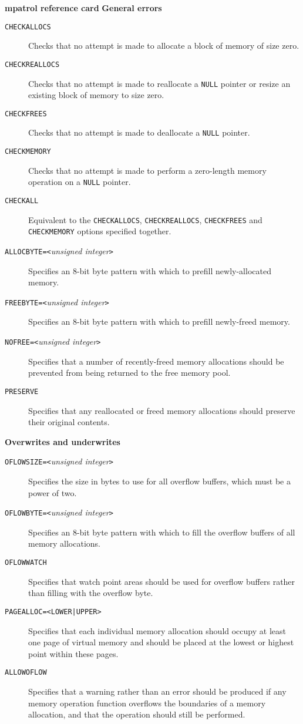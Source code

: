 \documentclass[a4paper,landscape,final]{article}
\newcommand{\heading}[1]{\textbf{\normalsize #1}}
\newcommand{\option}[1]{\texttt{#1}}
\newcommand{\optionarg}[2]{\option{#1}\texttt{=<#2>}}
\newcommand{\optionpar}[2]{\option{#1}\texttt{=<}\textit{#2}\texttt{>}}
\begin{document}
\begin{multicols}{3}{\textbf{\Large mpatrol reference card}}
\vskip 12pt
\heading{General errors}
\vskip 6pt

\begin{description}
\item[\option{CHECKALLOCS}]
Checks that no attempt is made to allocate a block of memory of size zero.
\item[\option{CHECKREALLOCS}]
Checks that no attempt is made to reallocate a \texttt{NULL} pointer or resize
an existing block of memory to size zero.
\item[\option{CHECKFREES}]
Checks that no attempt is made to deallocate a \texttt{NULL} pointer.
\item[\option{CHECKMEMORY}]
Checks that no attempt is made to perform a zero-length memory operation on a
\texttt{NULL} pointer.
\item[\option{CHECKALL}]
Equivalent to the \option{CHECKALLOCS}, \option{CHECKREALLOCS},
\option{CHECKFREES} and \option{CHECKMEMORY} options specified together.
\item[\optionpar{ALLOCBYTE}{unsigned integer}]
Specifies an 8-bit byte pattern with which to prefill newly-allocated memory.
\item[\optionpar{FREEBYTE}{unsigned integer}]
Specifies an 8-bit byte pattern with which to prefill newly-freed memory.
\item[\optionpar{NOFREE}{unsigned integer}]
Specifies that a number of recently-freed memory allocations should be prevented
from being returned to the free memory pool.
\item[\option{PRESERVE}]
Specifies that any reallocated or freed memory allocations should preserve their
original contents.
\end{description}

\vskip 12pt
\heading{Overwrites and underwrites}
\vskip 6pt

\begin{description}
\item[\optionpar{OFLOWSIZE}{unsigned integer}]
Specifies the size in bytes to use for all overflow buffers, which must be a
power of two.
\item[\optionpar{OFLOWBYTE}{unsigned integer}]
Specifies an 8-bit byte pattern with which to fill the overflow buffers of all
memory allocations.
\item[\option{OFLOWWATCH}]
Specifies that watch point areas should be used for overflow buffers rather than
filling with the overflow byte.
\item[\optionarg{PAGEALLOC}{LOWER|UPPER}]
Specifies that each individual memory allocation should occupy at least one page
of virtual memory and should be placed at the lowest or highest point within
these pages.
\item[\option{ALLOWOFLOW}]
Specifies that a warning rather than an error should be produced if any memory
operation function overflows the boundaries of a memory allocation, and that
the operation should still be performed.
\end{description}


\end{multicols}
\end{document}
